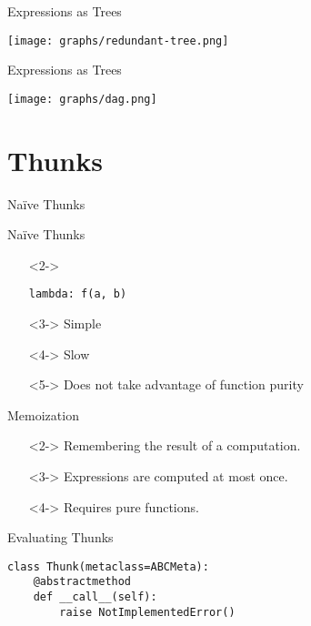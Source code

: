 \documentclass{beamer}
\begin{document}
\begin{frame}{Expressions as Trees}
  \begin{center}
    \texttt{[image: graphs/redundant-tree.png]}
  \end{center}
\end{frame}

\begin{frame}{Expressions as Trees}
  \begin{center}
    \texttt{[image: graphs/dag.png]}
  \end{center}
\end{frame}

\section{Thunks}

\begin{frame}[fragile]{Na\"ive Thunks}
  \begin{block}{Na\"ive Thunks}
    \begin{itemize}
    \item[]<2-> \begin{verbatim}
lambda: f(a, b)
      \end{verbatim}
    \item[]<3-> Simple
    \item[]<4-> Slow
    \item[]<5-> Does not take advantage of function purity
    \end{itemize}
  \end{block}
\end{frame}

\begin{frame}{Memoization}
  \begin{definition}[Memoize]
    \begin{itemize}
    \item[]<2-> Remembering the result of a computation.
    \item[]<3-> Expressions are computed at most once.
    \item[]<4-> Requires pure functions.
    \end{itemize}
  \end{definition}
\end{frame}

\begin{frame}[fragile]{Evaluating Thunks}
  \begin{verbatim}
class Thunk(metaclass=ABCMeta):
    @abstractmethod
    def __call__(self):
        raise NotImplementedError()
  \end{verbatim}
\end{frame}
\end{document}
